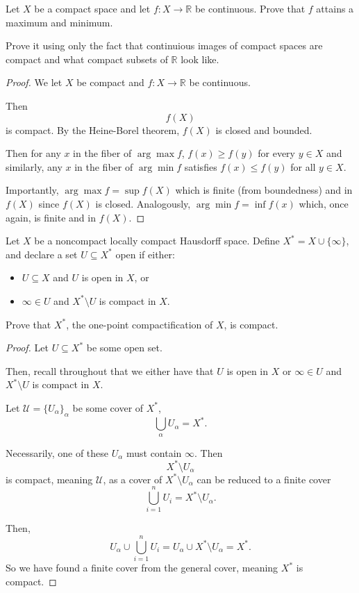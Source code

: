 \documentclass[11pt]{article}
\begin{document}
\begin{prob}
    Let $X$ be a compact space and let 
    $f : X \to \mathbb R$ be continuous. 
    Prove that $f$ attains a maximum and minimum. 

    Prove it using only the fact that 
    continuious images of compact spaces are compact 
    and what compact subsets of $\mathbb R$ look like. 
\end{prob}
\begin{proof}
    We let $X$ be compact and 
    $f: X \to \mathbb R$ be continuous. 

    Then 
    \[
        f(X)
    \]
    is compact. By the Heine-Borel theorem, 
    $f(X)$ is closed and bounded. 

    Then for any $x$ in the fiber of $\arg\max f$, 
    $f(x) \geq f(y)$ for every $y \in X$ and similarly, 
    any $x$ in the fiber of $\arg\min f$ satisfies 
    $f(x) \leq f(y)$ for all $y \in X$. 
    
    Importantly, $\arg\max f = \sup f(X)$ which is finite 
    (from boundedness) and in $f(X)$ since $f(X)$ is closed. 
    Analogously, $\arg\min f = \inf f(x)$ which, once again, 
    is finite and in $f(X)$. 
\end{proof}


\begin{prob}
    Let $X$ be a noncompact locally compact 
    Hausdorff space. 
    Define $X^* = X \cup \{\infty\}$, 
    and declare a set $U \subseteq X^*$ open if either: 
    \begin{itemize}
        \item $U \subseteq X$ and $U$ is open in $X$, or 
        \item $\infty \in U$ and $X^* \setminus U$ is compact 
            in $X$. 
    \end{itemize}
    Prove that $X^*$, the one-point compactification of $X$, 
    is compact. 
\end{prob}
\begin{proof}
    Let $U \subseteq X^*$ be some open set. 


    Then, recall throughout that we either have that 
    $U$ is open in $X$ or 
    $\infty \in U$ and $X^* \setminus U$ is compact 
    in $X$. 
  
    Let $\mathcal U = \{U_\alpha\}_{\alpha}$ 
    be some cover of $X^*$, 
    \[
        \bigcup_\alpha U_\alpha = X^*. 
    \]

    Necessarily, one of these $U_\alpha$ must 
    contain $\infty$. Then 
    \[
        X^* \setminus U_\alpha
    \]
    is compact, meaning $\mathcal U$, as a 
    cover of $X^* \setminus U_\alpha$ can be reduced 
    to a finite cover 
    \[
        \bigcup_{i=1}^n U_i = X^* \setminus U_\alpha. 
    \]

    Then, 
    \[
        U_\alpha \cup \bigcup_{i=1}^n U_i 
        = U_\alpha \cup X^* \setminus U_\alpha 
        = X^*. 
    \]
    So we have found a finite cover from 
    the general cover, meaning 
    $X^*$ is compact. 
\end{proof}
\end{document}
